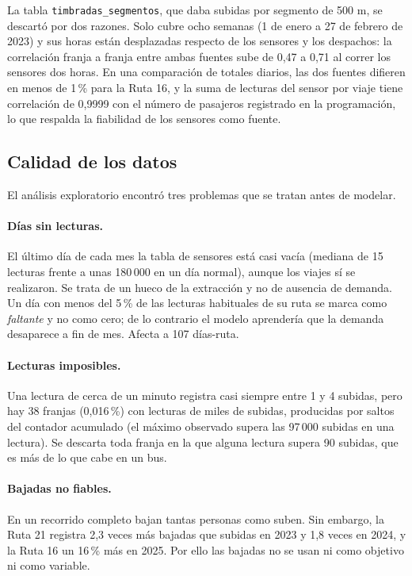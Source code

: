 \documentclass[11pt,a4paper]{article}
\begin{document}
La tabla \texttt{timbradas\_segmentos}, que daba subidas por segmento de 500 m, se descartó por dos razones. Solo cubre ocho semanas (1 de enero a 27 de febrero de 2023) y sus horas están desplazadas respecto de los sensores y los despachos: la correlación franja a franja entre ambas fuentes sube de 0,47 a 0,71 al correr los sensores dos horas. En una comparación de totales diarios, las dos fuentes difieren en menos de 1\,\% para la Ruta 16, y la suma de lecturas del sensor por viaje tiene correlación de 0,9999 con el número de pasajeros registrado en la programación, lo que respalda la fiabilidad de los sensores como fuente.

\subsection{Calidad de los datos}

El análisis exploratorio encontró tres problemas que se tratan antes de modelar.

\paragraph{Días sin lecturas.} El último día de cada mes la tabla de sensores está casi vacía (mediana de 15 lecturas frente a unas 180\,000 en un día normal), aunque los viajes sí se realizaron. Se trata de un hueco de la extracción y no de ausencia de demanda. Un día con menos del 5\,\% de las lecturas habituales de su ruta se marca como \emph{faltante} y no como cero; de lo contrario el modelo aprendería que la demanda desaparece a fin de mes. Afecta a 107 días-ruta.

\paragraph{Lecturas imposibles.} Una lectura de cerca de un minuto registra casi siempre entre 1 y 4 subidas, pero hay 38 franjas (0,016\,\%) con lecturas de miles de subidas, producidas por saltos del contador acumulado (el máximo observado supera las 97\,000 subidas en una lectura). Se descarta toda franja en la que alguna lectura supera 90 subidas, que es más de lo que cabe en un bus.

\paragraph{Bajadas no fiables.} En un recorrido completo bajan tantas personas como suben. Sin embargo, la Ruta 21 registra 2,3 veces más bajadas que subidas en 2023 y 1,8 veces en 2024, y la Ruta 16 un 16\,\% más en 2025. Por ello las bajadas no se usan ni como objetivo ni como variable.
\end{document}
